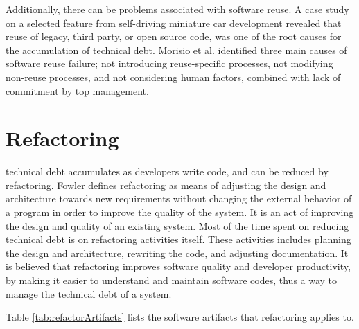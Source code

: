 {Additionally, there can be problems associated with software reuse. A case study on a selected feature from self-driving miniature car development revealed that reuse of legacy, third party, or open source code, was one of the root causes for the accumulation of technical debt\cite{6974884}. Morisio et al.\cite{995420} identified three main causes of software reuse failure; not introducing reuse-specific processes, not modifying non-reuse processes, and not considering human factors, combined with lack of commitment by top management.



\section{Refactoring}
\label{sec:2-Refactoring}
technical debt accumulates as developers write code\cite{Zazworka:2011:PDD:1985362.1985372}, and can be reduced by refactoring. Fowler defines refactoring as means of adjusting the design and architecture towards new requirements without changing the external behavior of a program in order to improve the quality of the system\cite{1999:RID:311424}. It is an act of improving the design and quality of an existing system\cite{Vliet:2008:SEP:1481475}. Most of the time spent on reducing technical debt is on refactoring activities itself. These activities includes planning the design and architecture, rewriting the code, and adjusting documentation\cite{Pressman:2009:SEP:1593949}. It is believed that refactoring improves software quality and developer productivity, by making it easier to understand and maintain software codes\cite{Kim:2012:FSR:2393596.2393655}, thus a way to manage the technical debt of a system. 

Table \ref{tab:refactorArtifacts} lists the software artifacts that refactoring applies to\cite{1265817}.

}
